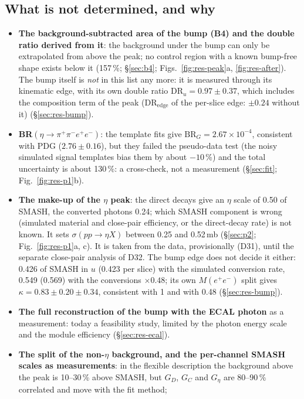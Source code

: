 \documentclass[11pt,a4paper]{article}
\newcommand{\ppee}{\ensuremath{\pi^{+}\pi^{-}e^{+}e^{-}}\xspace}
\newcommand{\Mee}{\ensuremath{M(e^{+}e^{-})}\xspace}
\newcommand{\BRG}{\ensuremath{\mathrm{BR}_G}\xspace}
\newcommand{\sigeta}{\ensuremath{\sigma(pp\to\eta X)}\xspace}
\newcommand{\Geta}{\ensuremath{G_\eta}\xspace}
\begin{document}
\subsection{What is not determined, and why}
\label{sec:res-notdet}
\begin{itemize}\setlength{\itemsep}{1pt}
\item \textbf{The background-subtracted area of the bump (B4) and the double ratio derived from it}: the background under the bump can only be
      extrapolated from above the peak; no control region with a known bump-free shape exists below it (157\,\%; \S\ref{sec:b4};
      Figs.~\ref{fig:res-peak}a, \ref{fig:res-after}). The bump itself is \emph{not} in this list any more: it is measured through its kinematic
      edge, with its own double ratio $\mathrm{DR}_u=0.97\pm0.37$, which includes the composition term of the peak
      ($\mathrm{DR}_{\mathrm{edge}}$ of the per-slice edge: $\pm0.24$ without it) (\S\ref{sec:res-bump}).
\item \textbf{BR$(\eta\to\ppee)$}: the template fits give $\BRG=2.67\times10^{-4}$, consistent with PDG ($2.76\pm0.16$), but they failed the
      pseudo-data test (the noisy simulated signal templates bias them by about $-10$\,\%) and the total uncertainty is about 130\,\%: a
      cross-check, not a measurement (\S\ref{sec:fit}; Fig.~\ref{fig:res-p1}b).
\item \textbf{The make-up of the $\eta$ peak}: the direct decays give an $\eta$ scale of 0.50 of SMASH, the converted photons 0.24; which SMASH
      component is wrong (simulated material and close-pair efficiency, or the direct-decay rate) is not known. It sets \sigeta between 0.25
      and 0.52\,mb (\S\ref{sec:p2}; Fig.~\ref{fig:res-p1}a, c). It is taken from the data, provisionally (D31), until the separate close-pair
      analysis of D32. The bump edge does not decide it either: 0.426 of SMASH in $u$ (0.423 per slice) with the simulated conversion rate,
      0.549 (0.569) with the conversions $\times0.48$; its own \Mee split gives $\kappa=0.83\pm0.20\pm0.34$, consistent with 1 and with 0.48
      (\S\ref{sec:res-bump}).
\item \textbf{The full reconstruction of the bump with the ECAL photon} as a measurement: today a feasibility study, limited by the photon
      energy scale and the module efficiency (\S\ref{sec:res-ecal}).
\item \textbf{The split of the non-$\eta$ background, and the per-channel SMASH scales as measurements}: in the flexible description the
      background above the peak is 10--30\,\% above SMASH, but $G_D$, $G_C$ and \Geta are 80--90\,\% correlated and move with the fit method;

\end{itemize}
\end{document}
